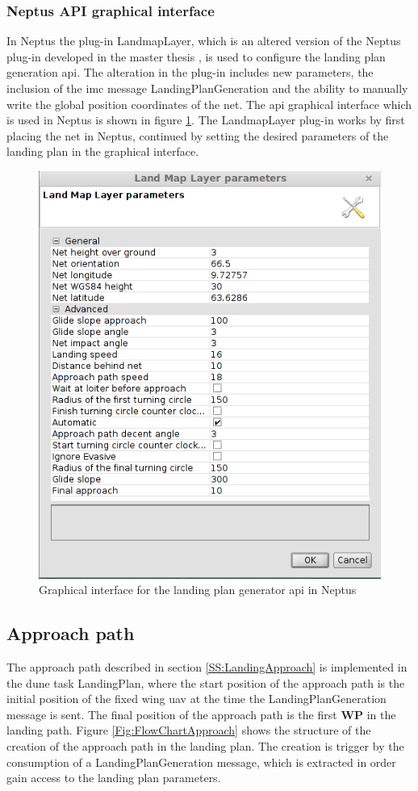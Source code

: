 \subsubsection{Neptus API graphical interface}
In Neptus the plug-in LandmapLayer, which is an altered version of the Neptus plug-in developed in the master thesis \citep{Froelich}, is used to configure the landing plan generation \gls{api}. The alteration in the plug-in includes new parameters, the inclusion of the \gls{imc} message LandingPlanGeneration and the ability to manually write the global position coordinates of the net. The \gls{api} graphical interface which is used in Neptus is shown in figure \ref{Fig:LandMapLayer}. The LandmapLayer plug-in works by first placing the net in Neptus, continued by setting the desired parameters of the landing plan in the graphical interface.
\newpage
\begin{figure}[H]
\centering
\includegraphics[scale=0.6]{figs/LandMapLayer.png}
\caption{Graphical interface for the landing plan  generator \gls{api} in Neptus}
\label{Fig:LandMapLayer}
\end{figure}
\subsection{Approach path}
The approach path described in section \ref{SS:LandingApproach} is implemented in the \gls{dune} task LandingPlan, where the start position of the approach path is the initial position of the fixed wing \gls{uav} at the time the LandingPlanGeneration message is sent. The final position of the approach path is the first $\textbf{WP}$ in the landing path. Figure \ref{Fig:FlowChartApproach} shows the structure of the creation of the approach path in the landing plan. The creation is trigger by the consumption of a LandingPlanGeneration message, which is extracted in order gain access to the landing plan parameters. 

